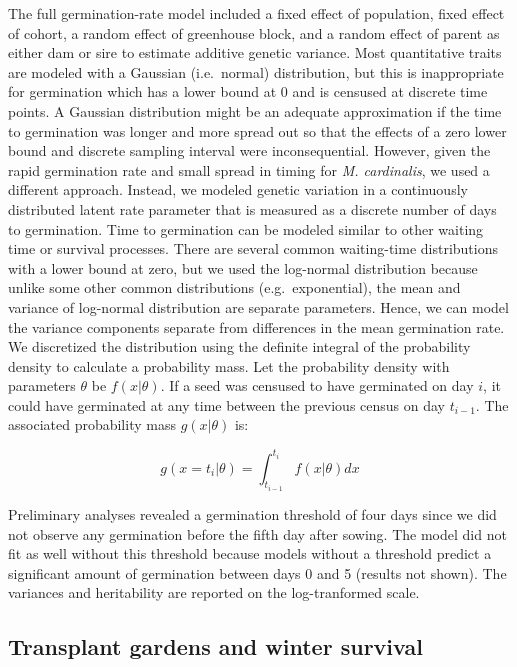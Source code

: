 \documentclass[
  12pt,
]{article}
\begin{document}
The full germination-rate model included a fixed effect of population, fixed effect of cohort, a random effect of greenhouse block, and a random effect of parent as either dam or sire to estimate additive genetic variance. Most quantitative traits are modeled with a Gaussian (i.e.~normal) distribution, but this is inappropriate for germination which has a lower bound at 0 and is censused at discrete time points. A Gaussian distribution might be an adequate approximation if the time to germination was longer and more spread out so that the effects of a zero lower bound and discrete sampling interval were inconsequential. However, given the rapid germination rate and small spread in timing for \emph{M. cardinalis}, we used a different approach. Instead, we modeled genetic variation in a continuously distributed latent rate parameter that is measured as a discrete number of days to germination. Time to germination can be modeled similar to other waiting time or survival processes. There are several common waiting-time distributions with a lower bound at zero, but we used the log-normal distribution because unlike some other common distributions (e.g.~exponential), the mean and variance of log-normal distribution are separate parameters. Hence, we can model the variance components separate from differences in the mean germination rate. We discretized the distribution using the definite integral of the probability density to calculate a probability mass. Let the probability density with parameters \(\theta\) be \(f(x|\theta)\). If a seed was censused to have germinated on day \(i\), it could have germinated at any time between the previous census on day \(t_{i-1}\). The associated probability mass \(g(x|\theta)\) is:

\[g(x=t_i|\theta) = \int_{t_{i-1}}^{t_i} f(x|\theta) dx\]

Preliminary analyses revealed a germination threshold of four days since we did not observe any germination before the fifth day after sowing. The model did not fit as well without this threshold because models without a threshold predict a significant amount of germination between days 0 and 5 (results not shown). The variances and heritability are reported on the log-tranformed scale.

\hypertarget{transplant-gardens-and-winter-survival}{%
\subsection{Transplant gardens and winter survival}\label{transplant-gardens-and-winter-survival}}
\end{document}
